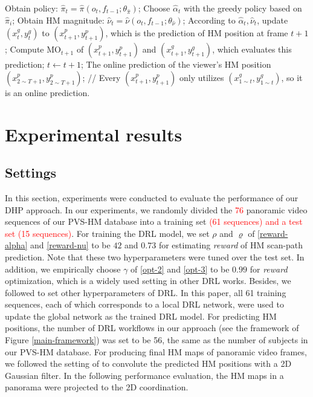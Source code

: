 \documentclass[10pt,journal,compsoc]{IEEEtran}
\begin{document}
\begin{algorithm}
\begin{algorithmic}
       \STATE Obtain policy: $\hat{\pi}_{t}=\hat{\pi}( o_{t}, f_{t-1} ; \theta_{\hat{\pi}})$;
       \STATE Choose $\hat{\alpha}_{t}$ with the greedy policy based on $\hat{\pi}_{i}$;
       \STATE Obtain HM magnitude: $\hat{\nu}_{t}=\hat{\nu}(o_{t}, f_{t-1} ; \theta_{\hat{\nu}})$;
       \STATE According to $\hat{\alpha}_{t},\hat{\nu}_{t}$, update $(x^{g}_{t}, y^{g}_{t})$ to $(x^{p}_{t+1}, y^{p}_{t+1})$, which is the prediction of HM position at frame $t+1$;
       \STATE Compute $\text{MO}_{t+1}$ of $(x^{p}_{t+1},y^{p}_{t+1})$ and $(x^{g}_{t+1},y^{g}_{t+1})$, which evaluates this prediction;
       \STATE $t \leftarrow t+1$;
  \ENDFOR
   The online prediction of the viewer's HM position $(x^{p}_{2 \sim T+1},y^{p}_{2 \sim T+1})$; // Every $(x^{p}_{t+1},y^{p}_{t+1})$ only utilizes $(x^{g}_{1 \sim t},y^{g}_{1 \sim t})$, so it is an online prediction.
\end{algorithmic}
\end{algorithm}

\section{Experimental results}

\subsection{Settings}
In this section, experiments were conducted to evaluate the performance of our DHP approach. In our experiments, we randomly divided the \textcolor{red} {76} panoramic video sequences of our PVS-HM database into a training set \textcolor{red}{(61 sequences) and a test set (15 sequences)}. For training the DRL model, we set $\rho$ and $\varrho$ of \eqref{reward-alpha} and \eqref{reward-nu} to be $42$ and $0.73$ for estimating \textit{reward} of HM scan-path prediction. Note that these two hyperparameters were tuned over the test set. In addition, we empirically choose $\gamma$ of \eqref{opt-2} and \eqref{opt-3} to be $0.99$ for \textit{reward} optimization, which is a widely used setting in other DRL works. Besides, we followed \cite{mnih2016asynchronous} to set other hyperparameters of DRL. In this paper, all 61 training sequences, each of which corresponds to a local DRL network, were used to update the global network as the trained DRL model.   For predicting HM positions, the number of DRL workflows in our approach (see the framework of Figure \ref{main-framework}) was set to be 56, the same as the number of subjects in our PVS-HM database. For producing final HM maps of panoramic video frames, we followed the setting of \cite{matin1974saccadic} to convolute the predicted HM positions with a 2D Gaussian filter. In the following performance evaluation, the HM maps in a panorama were projected to the 2D coordination.
\end{document}
